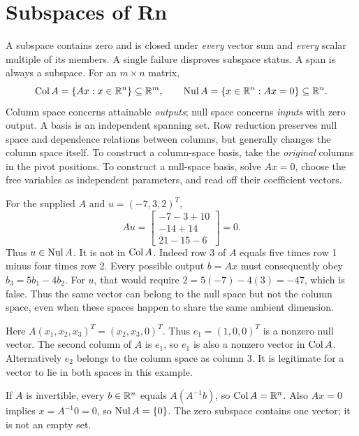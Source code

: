 \section{Subspaces of Rn}
A subspace contains zero and is closed under \emph{every} vector sum and
\emph{every} scalar multiple of its members. A single failure disproves
subspace status. A span is always a subspace. For an $m\times n$ matrix,
\[
 \operatorname{Col} A=\{Ax:x\in\mathbb{R}^n\}\subseteq\mathbb{R}^m,\qquad
 \operatorname{Nul} A=\{x\in\mathbb{R}^n:Ax=0\}\subseteq\mathbb{R}^n.
\]
Column space concerns attainable \emph{outputs}; null space concerns
\emph{inputs} with zero output. A basis is an independent spanning set.
Row reduction preserves null space and dependence relations between columns,
but generally changes the column space itself. To construct a column-space
basis, take the \emph{original} columns in the pivot positions.
To construct a null-space basis, solve $Ax=0$, choose the free variables
as independent parameters, and read off their coefficient vectors.

For the supplied $A$ and $u=(-7,3,2)^T$,
\[
 Au=\begin{bmatrix}-7-3+10\\-14+14\\21-15-6\end{bmatrix}=0.
\]
Thus $u\in\operatorname{Nul} A$. It is not in $\operatorname{Col} A$.
Indeed row 3 of $A$ equals five times row 1 minus four times row 2.
Every possible output $b=Ax$ must consequently obey $b_3=5b_1-4b_2$.
For $u$, that would require $2=5(-7)-4(3)=-47$, which is false.
Thus the same vector can belong to the null space but not the column space,
even when these spaces happen to share the same ambient dimension.

Here $A(x_1,x_2,x_3)^T=(x_2,x_3,0)^T$.
Thus $e_1=(1,0,0)^T$ is a nonzero null vector.
The second column of $A$ is $e_1$, so $e_1$ is also a nonzero vector in
$\operatorname{Col} A$. Alternatively $e_2$ belongs to the column space as column 3.
It is legitimate for a vector to lie in both spaces in this example.

If $A$ is invertible, every $b\in\mathbb{R}^n$ equals $A(A^{-1}b)$,
so $\operatorname{Col} A=\mathbb{R}^n$. Also $Ax=0$ implies $x=A^{-1}0=0$,
so $\operatorname{Nul} A=\{0\}$. The zero subspace contains one vector; it is not
an empty set.

